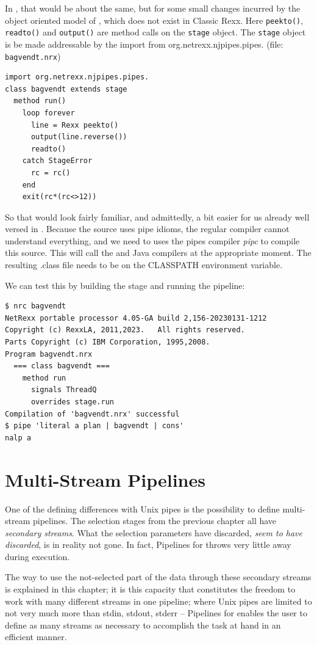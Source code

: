 In \nr{}, that would be about the same, but for some small changes
incurred by the object oriented model of \nr{}, which does not exist in Classic Rexx.
Here \texttt{peekto()}, \texttt{readto()} and
\texttt{output()} are method calls on the \texttt{stage} object.
The \texttt{stage} object is be made addressable
by the import from org.netrexx.njpipes.pipes. (file: \texttt{bagvendt.nrx})
\begin{lstlisting}
import org.netrexx.njpipes.pipes.
class bagvendt extends stage
  method run()
    loop forever
      line = Rexx peekto()
      output(line.reverse())
      readto()
    catch StageError
      rc = rc()
    end
    exit(rc*(rc<>12))
\end{lstlisting}
So that would look fairly familiar, and admittedly, a bit easier for us already well versed in \nr{}.
Because the source uses pipe idioms, the regular \nr{} compiler cannot understand everything, and we need to uses the pipes compiler \emph{pipc} to compile this source. This will call the \nr{} and Java compilers at the appropriate moment. The resulting .class file needs to be on the CLASSPATH environment variable.

We can test this by building the stage and running the pipeline:

\begin{lstlisting}
$ nrc bagvendt
NetRexx portable processor 4.05-GA build 2,156-20230131-1212
Copyright (c) RexxLA, 2011,2023.   All rights reserved.
Parts Copyright (c) IBM Corporation, 1995,2008.
Program bagvendt.nrx
  === class bagvendt ===
    method run
      signals ThreadQ
      overrides stage.run
Compilation of 'bagvendt.nrx' successful
$ pipe 'literal a plan | bagvendt | cons'
nalp a
\end{lstlisting}


\section{Multi-Stream Pipelines}
One of the defining differences with Unix pipes is the possibility to
define multi-stream pipelines. The selection stages from the previous
chapter all have \emph{secondary streams}. What the selection
parameters have discarded, \emph{seem to have discarded}, is in
reality not gone. In fact, Pipelines for \nr{} throws very little away during
execution.

The way to use the not-selected part of the data through
these secondary streams is explained in this chapter; it is this
capacity that constitutes the freedom to work with many different
streams in one pipeline; where Unix pipes are limited to not very much
more than stdin, stdout, stderr -- Pipelines for \nr{} enables the user
to define as many streams as necessary to accomplish the task at hand
in an efficient manner.

